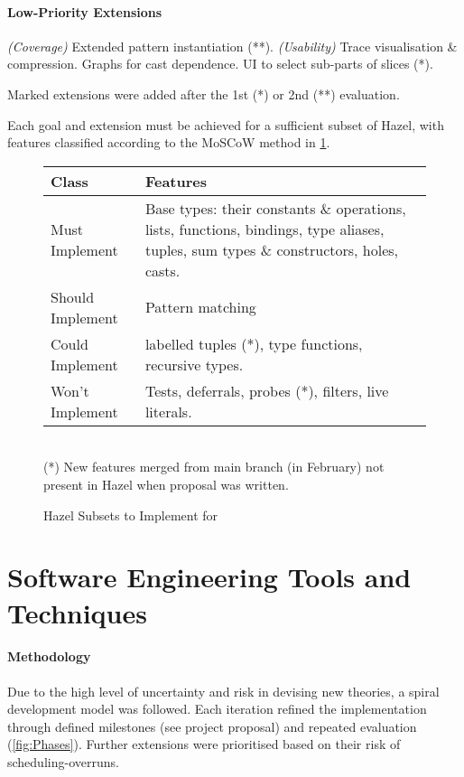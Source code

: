 \paragraph{{\color{blue} Low-Priority Extensions}} \textit{(Coverage)} Extended pattern instantiation (**). \textit{(Usability)} Trace visualisation \& compression. Graphs for cast dependence. UI to select sub-parts of slices (*). 


Marked extensions were added after the 1st (*) or 2nd (**) evaluation.

Each goal and extension must be achieved for a sufficient subset of Hazel, with features classified according to the MoSCoW method \cite{Moscow} in \cref{fig:Classes}.

\begin{figure}[h]
\begin{tabular}{lp{12cm}}
Class & Features\\
\hline
{\color{red}Must Implement} & {Base types: their constants \& operations, lists, functions, bindings, type aliases, tuples, sum types \& constructors, holes, casts.}\\
{\color{orange}Should Implement} & Pattern matching\\
{\color{blue}Could Implement} & labelled tuples (*), type functions, recursive types.\\
{\color{Green}Won't Implement} & Tests, deferrals, probes (*), filters, live literals.\\
\end{tabular}
\ \\

(*) New features merged from main branch (in February) not present in Hazel when proposal was written. 
\caption{Hazel Subsets to Implement for}
\label{fig:Classes}
\end{figure}

\section{Software Engineering Tools and Techniques}\label{sec:EngineeringMethodology}
\paragraph{Methodology} Due to the high level of uncertainty and risk in devising new theories, a spiral development model was followed. Each iteration refined the implementation through defined milestones (see project proposal) and repeated evaluation (\cref{fig:Phases}). Further extensions were prioritised based on their risk of scheduling-overruns.

